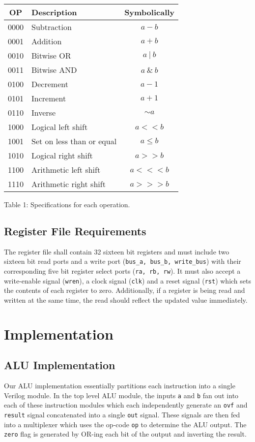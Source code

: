 \documentclass[11pt]{article}
\begin{document}
{\centering
\begin{tabular}{|c|l|c|}
	\hline
	\textbf{OP} & \textbf{Description} & \textbf{Symbolically}\\
	\hline
	0000 & Subtraction & $a - b$ \\
	0001 & Addition & $a + b$ \\
	0010 & Bitwise OR & $a~|~b$ \\
	0011 & Bitwise AND & $a~\&~b$ \\
	0100 & Decrement & $a - 1$ \\
	0101 & Increment & $a + 1$ \\
	0110 & Inverse & $\sim a$ \\
	1000 & Logical left shift & $a << b$ \\
	1001 & Set on less than or equal & $a \leq b$ \\
	1010 & Logical right shift & $a >> b$ \\
	1100 & Arithmetic left shift & $a <<< b$ \\
	1110 & Arithmetic right shift & $a >>> b$ \\
	\hline
\end{tabular} \par
} 

\vspace{12pt}
Table 1: Specifications for each operation.

\subsection{Register File Requirements}
The register file shall contain 32 sixteen bit registers and must include two sixteen bit read ports and a write port (\texttt{bus\_a, bus\_b, write\_bus}) with their corresponding five bit register select ports (\texttt{ra, rb, rw}). It must also accept a write-enable signal (\texttt{wren}), a clock signal (\texttt{clk}) and a reset signal (\texttt{rst}) which sets the contents of each register to zero. Additionally, if a register is being read and written at the same time, the read should reflect the updated value immediately. 

\section{Implementation}
\subsection{ALU Implementation}
Our ALU implementation essentially partitions each instruction into a single Verilog module. In the top level ALU module, the inputs \texttt{a} and \texttt{b} fan out into each of these instruction modules which each independently generate an \texttt{ovf} and \texttt{result} signal concatenated into a single \texttt{out} signal. These signals are then fed into a multiplexer which uses the op-code \texttt{op} to determine the ALU output. The \texttt{zero} flag is generated by OR-ing each bit of the output and inverting the result.
\end{document}
